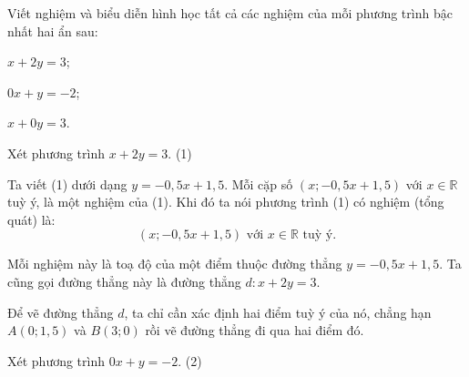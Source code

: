 \begin{vidu}		
    Viết nghiệm và biểu diễn hình học tất cả các nghiệm của mỗi phương trình bậc nhất hai ẩn sau:
    \begin{listEX}
        \item $x+2y=3$;
        \item $0x+y=-2$;
        \item $x+0y=3$.
    \end{listEX}
    \doicot
    \begin{listEX}
        \item Xét phương trình $x + 2y = 3$. \hfill (1)

        Ta viết (1) dưới dạng $y = -0,5x + 1,5$. Mỗi cặp số $(x; -0,5x + 1,5)$ với $x \in \mathbb{R}$ tuỳ ý, là một nghiệm của (1). Khi đó ta nói phương trình (1) có nghiệm (tổng quát) là:
        $$(x; -0,5x + 1,5)\text{ với }x \in \mathbb{R}\text{ tuỳ ý.}$$
        
        \begin{center}
        \end{center}
        
        Mỗi nghiệm này là toạ độ của một điểm thuộc đường thẳng $y = -0,5x + 1,5$. Ta cũng gọi đường thẳng này là đường thẳng $d: x + 2y = 3$.
        
        Để vẽ đường thẳng $d$, ta chỉ cần xác định hai điểm tuỳ ý của nó, chẳng hạn $A(0; 1,5)$ và $B(3; 0)$ rồi vẽ đường thẳng đi qua hai điểm đó.
        \item Xét phương trình $0x + y = -2$. \hfill (2)
        

\end{listEX}
\end{vidu}
